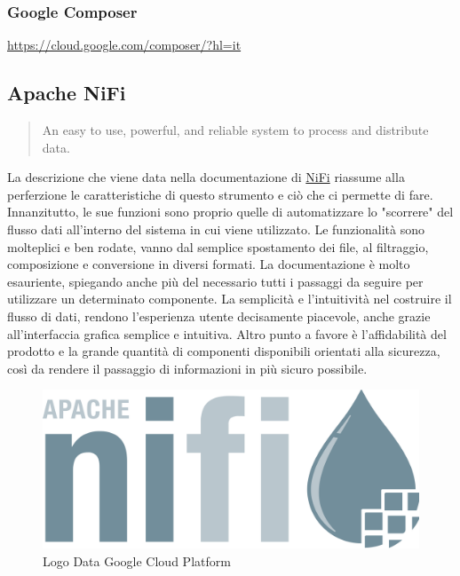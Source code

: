 \subsubsection{Google Composer}
\url{https://cloud.google.com/composer/?hl=it}
\subsection{Apache NiFi}
\begin{quotation}
An easy to use, powerful, and reliable system to process and distribute data.
\end{quotation}
La descrizione che viene data nella documentazione di \href{https://nifi.apache.org/docs/nifi-docs/html/getting-started.html}{NiFi} riassume alla perferzione le caratteristiche di questo strumento e ciò che ci permette di fare.
\\Innanzitutto, le sue funzioni sono proprio quelle di automatizzare lo "scorrere" del flusso dati all'interno del sistema in cui viene utilizzato. Le funzionalità sono molteplici e ben rodate, vanno dal semplice spostamento dei file, al filtraggio, composizione e conversione in diversi formati. La documentazione è molto esauriente, spiegando anche più del necessario tutti i passaggi da seguire per utilizzare un determinato componente. La semplicità e l'intuitività nel costruire il flusso di dati, rendono l'esperienza utente decisamente piacevole, anche grazie all'interfaccia grafica semplice e intuitiva. Altro punto a favore è l'affidabilità del prodotto e la grande quantità di componenti disponibili orientati alla sicurezza, così da rendere il passaggio di informazioni in più sicuro possibile.
\begin{figure}[h!]
	\centering
	\includegraphics[scale=0.1]{figures/apache-nifi-logo}
	\caption[Short figure name.]{Logo Data Google Cloud Platform
		\label{fig:logoGCP}}
\end{figure}	

